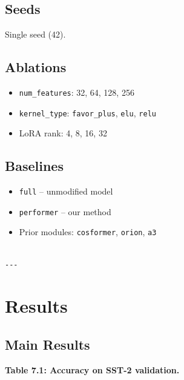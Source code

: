 \subsection{Seeds}

Single seed (42).

\subsection{Ablations}

\begin{itemize}
\item \texttt{num\_features}: 32, 64, 128, 256
\item \texttt{kernel\_type}: \texttt{favor\_plus}, \texttt{elu}, \texttt{relu}
\item LoRA rank: 4, 8, 16, 32

\end{itemize}
\subsection{Baselines}

\begin{itemize}
\item \texttt{full} -- unmodified model
\item \texttt{performer} -- our method
\item Prior modules: \texttt{cosformer}, \texttt{orion}, \texttt{a3}
\end{itemize}
\begin{lstlisting}

---
\end{lstlisting}


\section{Results}

\subsection{Main Results}

\textbf{Table 7.1: Accuracy on SST-2 validation.}

